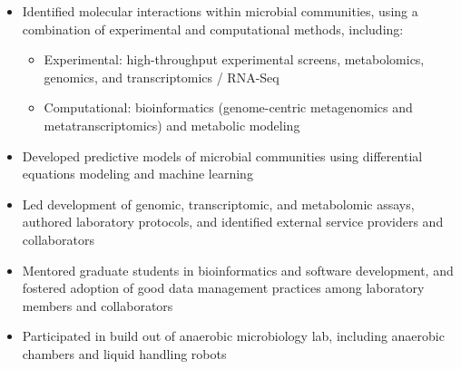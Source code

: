 \documentclass[letterpaper,10pt]{article}
\begin{document}
\begin{itemize}
\begin{itemize}
			\item Identified molecular interactions within microbial communities, using a combination of experimental and computational methods, including: 
				\begin{itemize}
				\item Experimental: high-throughput experimental screens, metabolomics, genomics, and transcriptomics / RNA-Seq
				\item Computational: bioinformatics (genome-centric metagenomics and metatranscriptomics) and metabolic modeling
				\end{itemize}
			\item Developed predictive models of microbial communities using differential equations modeling and machine learning
			\item Led development of genomic, transcriptomic, and metabolomic assays, authored laboratory protocols, and identified external service providers and collaborators
			\item Mentored graduate students in bioinformatics and software development, and fostered adoption of good data management practices among laboratory members and collaborators
			\item Participated in build out of anaerobic microbiology lab, including anaerobic chambers and liquid handling robots

\end{itemize}
\end{itemize}
\end{document}
